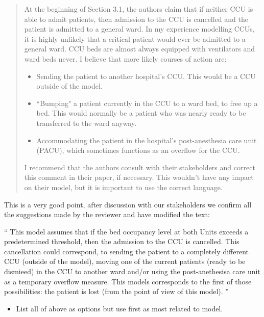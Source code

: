 \documentclass{article}
\begin{document}
\begin{quote}
    \begin{textit}
        {
        At the beginning of Section 3.1, the authors claim that if neither CCU
        is able to admit patients, then admission to the CCU is cancelled and
        the patient is admitted to a general ward. In my experience modelling
        CCUs, it is highly unlikely that a critical patient would ever be
        admitted to a general ward.  CCU beds are almost always equipped with
        ventilators and ward beds never. I believe that more likely courses of
        action are:
        \begin{itemize}
         \item Sending the patient to another hospital's CCU.  This would be a CCU
           outside of the model.
         \item ``Bumping" a patient currently in the CCU to a ward bed, to free up
           a bed. This would normally be a patient who was nearly ready to be
           transferred to the ward anyway.
         \item Accommodating the patient in the hospital's post-anesthesia care
           unit (PACU), which sometimes functions as an overflow for the CCU.
        \end{itemize}
        I recommend that the authors consult with their stakeholders and
        correct this comment in their paper, if necessary.  This wouldn't have
        any impact on their model, but it is important to use the correct
        language.
        }
    \end{textit}
\end{quote}

This is a very good point, after discussion with our stakeholders we confirm all
the suggestions made by the reviewer and have modified the text:

``
This model assumes that if the bed occupancy level at both Units exceeds a
predetermined threshold, then the admission to the CCU is cancelled. This
cancellation could correspond, to sending the patient to a completely different
CCU (outside of the model), moving one of the current patients (ready to be
dismieed) in the CCU to another ward and/or using the post-anethesisa care unit
as a temporary overflow measure. This models corresponds to the first of those
possibilities: the patient is lost (from the point of view of this model).
''

\begin{itemize}
    \item List all of above as options but use first as most related to model.
\end{itemize}
\end{document}
